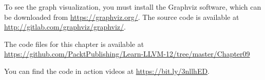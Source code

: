 To see the graph visualization, you must install the Graphviz software, which can be downloaded from \url{https://graphviz.org/}. The source code is available at \url{http://gitlab.com/graphviz/graphviz/}. \par

The code files for this chapter is available at  \url{https://github.com/PacktPublishing/Learn-LLVM-12/tree/master/Chapter09}\par

You can find the code in action videos at \url{https://bit.ly/3nllhED}.\par